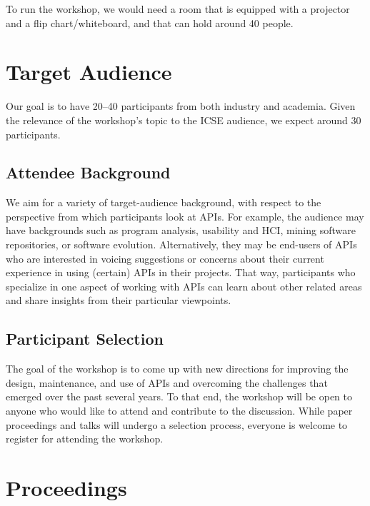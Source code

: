 \documentclass[10pt, conference]{IEEEtran}
\begin{document}
To run the workshop, we would need a room that is equipped with a projector and a flip chart/whiteboard, and that can hold around 40 people.

\section{Target Audience}

Our goal is to have 20--40 participants from both industry and academia. Given the relevance of the workshop's topic to the ICSE audience, we expect around 30 participants.

\subsection{Attendee Background} 
We aim for a variety of target-audience background, with respect to the perspective from which participants look at APIs. For example, the audience may have backgrounds such as program analysis, usability and HCI, mining software repositories, or software evolution. Alternatively, they may be end-users of APIs who are interested in voicing suggestions or concerns about their current experience in using (certain) APIs in their projects. That way, participants who specialize in one aspect of working with APIs can learn about other related areas and share insights from their particular viewpoints.

\subsection{Participant Selection}
The goal of the workshop is to come up with new directions for improving the design, maintenance, and use of APIs and overcoming the challenges that emerged over the past several years. To that end, the workshop will be open to anyone who would like to attend and contribute to the discussion. While paper proceedings and talks will undergo a selection process, everyone is welcome to register for attending the workshop. 

\section{Proceedings}
\end{document}
